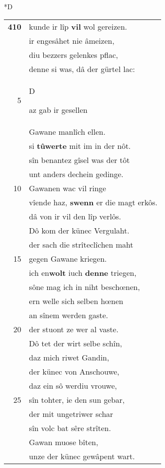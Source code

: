 \documentclass[8pt,a4paper,notitlepage]{article}
\begin{document}
\begin{table}[ht]
\begin{minipage}[t]{0.5\linewidth}
\small
\begin{center}*D
\end{center}
\begin{tabular}{rl}
\textbf{410} & kunde ir lîp \textbf{vil} wol gereizen.\\ 
 & ir engesâhet nie âmeizen,\\ 
 & diu bezzers gelenkes pflac,\\ 
 & denne si was, dâ der gürtel lac:\\ 
5 & \begin{large}D\end{large}az gab ir gesellen\\ 
 & Gawane manlîch ellen.\\ 
 & si \textbf{tûwerte} mit im in der nôt.\\ 
 & sîn benantez gîsel was der tôt\\ 
 & unt anders dechein gedinge.\\ 
10 & Gawanen wac vil ringe\\ 
 & vîende haz, \textbf{swenn} er die magt erkôs.\\ 
 & dâ von ir vil den lîp verlôs.\\ 
 & Dô kom der künec Vergulaht.\\ 
 & der sach die strîteclîchen maht\\ 
15 & gegen Gawane kriegen.\\ 
 & ich en\textbf{wolt} iuch \textbf{denne} triegen,\\ 
 & sône mag ich in niht beschœnen,\\ 
 & ern welle sich selben hœnen\\ 
 & an sînem werden gaste.\\ 
20 & der stuont ze wer al vaste.\\ 
 & Dô tet der wirt selbe schîn,\\ 
 & daz mich riwet Gandin,\\ 
 & der künec von Anschouwe,\\ 
 & daz ein sô werdiu vrouwe,\\ 
25 & sîn tohter, ie den sun gebar,\\ 
 & der mit ungetriwer schar\\ 
 & sîn volc bat sêre strîten.\\ 
 & Gawan muose bîten,\\ 
 & unze der künec gewâpent wart.\\ 

\end{tabular}
\end{minipage}
\end{table}
\end{document}
